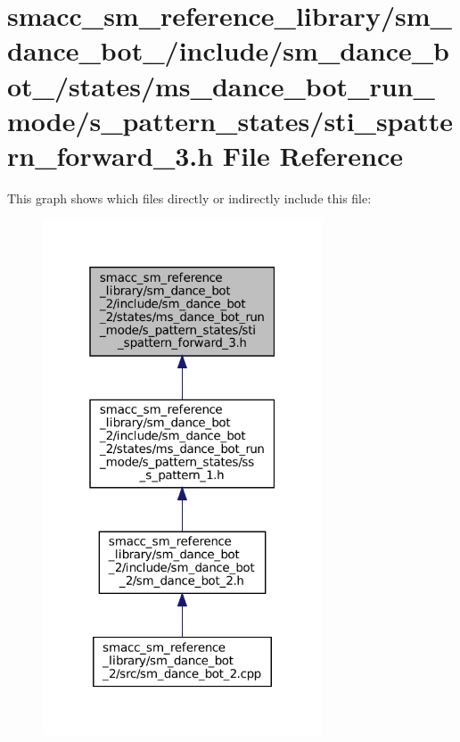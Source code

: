 \hypertarget{sm__dance__bot__2_2include_2sm__dance__bot__2_2states_2ms__dance__bot__run__mode_2s__pattern__st2b9833c4e2ff6f3273febb06d0f30aaf}{}\section{smacc\+\_\+sm\+\_\+reference\+\_\+library/sm\+\_\+dance\+\_\+bot\+\_/include/sm\+\_\+dance\+\_\+bot\+\_/states/ms\+\_\+dance\+\_\+bot\+\_\+run\+\_\+mode/s\+\_\+pattern\+\_\+states/sti\+\_\+spattern\+\_\+forward\+\_\+3.h File Reference}
\label{sm__dance__bot__2_2include_2sm__dance__bot__2_2states_2ms__dance__bot__run__mode_2s__pattern__st2b9833c4e2ff6f3273febb06d0f30aaf}
This graph shows which files directly or indirectly include this file\+:
\nopagebreak
\begin{figure}[H]
\begin{center}
\leavevmode
\includegraphics[width=235pt]{sm__dance__bot__2_2include_2sm__dance__bot__2_2states_2ms__dance__bot__run__mode_2s__pattern__sted357b0fdbfc8b9e0318635aa51478fd}
\end{center}
\end{figure}
